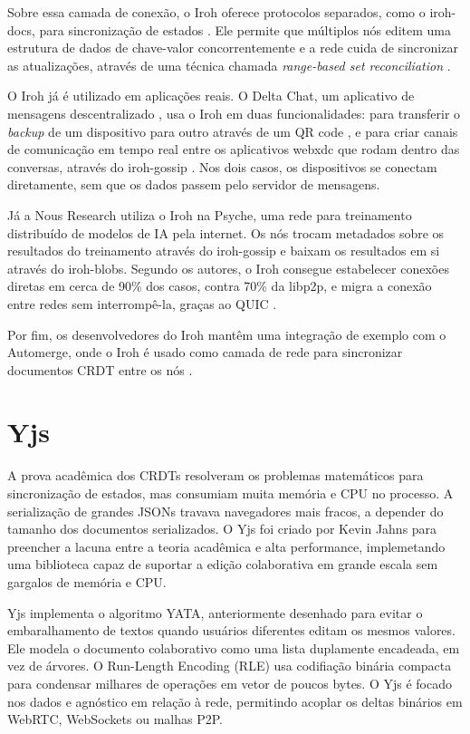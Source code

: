 Sobre essa camada de conexão, o Iroh oferece protocolos separados, como o iroh-docs, para sincronização de estados \cite{irohprotocols}. Ele permite que múltiplos nós editem uma estrutura de dados de
chave-valor concorrentemente e a rede cuida de sincronizar as atualizações, através de uma técnica chamada \textit{range-based set reconciliation} \cite{irohdocs, meyer2022}.

O Iroh já é utilizado em aplicações reais. O Delta Chat, um aplicativo de mensagens descentralizado \cite{deltachat}, usa o Iroh em duas funcionalidades: para transferir o
\textit{backup} de um dispositivo para outro através de um QR code \cite{deltachattransfer}, e para criar canais de comunicação em tempo real entre os aplicativos webxdc
que rodam dentro das conversas, através do iroh-gossip \cite{deltachatpeerchannels}. Nos dois casos, os dispositivos se conectam diretamente, sem que os dados passem pelo servidor de mensagens.

Já a Nous Research utiliza o Iroh na Psyche, uma rede para treinamento distribuído de modelos de IA pela internet. Os nós trocam metadados sobre os resultados do treinamento
através do iroh-gossip e baixam os resultados em si através do iroh-blobs. Segundo os autores, o Iroh consegue estabelecer conexões diretas em cerca de 90\% dos casos, contra
70\% da libp2p, e migra a conexão entre redes sem interrompê-la, graças ao QUIC \cite{nouspsyche}.

Por fim, os desenvolvedores do Iroh mantêm uma integração de exemplo com o Automerge, onde o Iroh é usado como camada de rede para sincronizar documentos CRDT entre os nós \cite{irohautomerge}.

\section{Yjs}

A prova acadêmica dos CRDTs resolveram os problemas matemáticos para sincronização de estados, mas consumiam muita memória e CPU no processo. A serialização de grandes JSONs travava navegadores
mais fracos, a depender do tamanho dos documentos serializados. O Yjs foi criado por Kevin Jahns para preencher a lacuna entre a teoria acadêmica e alta performance, implemetando uma biblioteca capaz
de suportar a edição colaborativa em grande escala sem gargalos de memória e CPU.

Yjs implementa o algoritmo YATA, anteriormente desenhado para evitar o embaralhamento de textos quando usuários diferentes editam os mesmos valores. Ele modela o documento colaborativo como uma lista
duplamente encadeada, em vez de árvores. O Run-Length Encoding (RLE) usa codifiação binária compacta para condensar milhares de operações em vetor de poucos bytes. O Yjs é focado nos dados e agnóstico
em relação à rede, permitindo acoplar os deltas binários em WebRTC, WebSockets ou malhas P2P.

